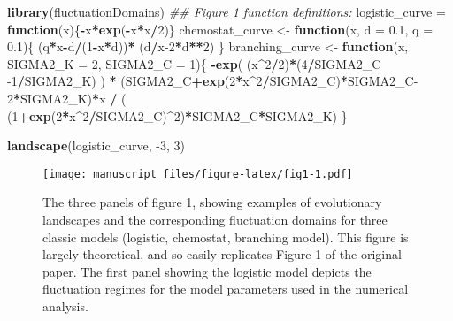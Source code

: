 \documentclass[
]{rescience}
\newenvironment{Shaded}{\begin{snugshade}}{\end{snugshade}}
\newcommand{\CommentTok}[1]{\textcolor[rgb]{0.56,0.35,0.01}{\textit{#1}}}
\newcommand{\ControlFlowTok}[1]{\textcolor[rgb]{0.13,0.29,0.53}{\textbf{#1}}}
\newcommand{\DataTypeTok}[1]{\textcolor[rgb]{0.13,0.29,0.53}{#1}}
\newcommand{\DecValTok}[1]{\textcolor[rgb]{0.00,0.00,0.81}{#1}}
\newcommand{\FloatTok}[1]{\textcolor[rgb]{0.00,0.00,0.81}{#1}}
\newcommand{\KeywordTok}[1]{\textcolor[rgb]{0.13,0.29,0.53}{\textbf{#1}}}
\newcommand{\NormalTok}[1]{#1}
\newcommand{\OperatorTok}[1]{\textcolor[rgb]{0.81,0.36,0.00}{\textbf{#1}}}
\newcommand{\StringTok}[1]{\textcolor[rgb]{0.31,0.60,0.02}{#1}}
\begin{document}
\begin{Shaded}
\begin{Highlighting}[]
\KeywordTok{library}\NormalTok{(fluctuationDomains)}
\CommentTok{## Figure 1 function definitions:}
\NormalTok{logistic_curve =}\StringTok{ }\ControlFlowTok{function}\NormalTok{(x)\{}\OperatorTok{-}\NormalTok{x}\OperatorTok{*}\KeywordTok{exp}\NormalTok{(}\OperatorTok{-}\NormalTok{x}\OperatorTok{*}\NormalTok{x}\OperatorTok{/}\DecValTok{2}\NormalTok{)\}}
\NormalTok{chemostat_curve <-}\StringTok{ }\ControlFlowTok{function}\NormalTok{(x, }\DataTypeTok{d =} \FloatTok{0.1}\NormalTok{, }\DataTypeTok{q =} \FloatTok{0.1}\NormalTok{)\{}
\NormalTok{  (q}\OperatorTok{*}\NormalTok{x}\OperatorTok{-}\NormalTok{d}\OperatorTok{/}\NormalTok{(}\DecValTok{1}\OperatorTok{-}\NormalTok{x}\OperatorTok{*}\NormalTok{d))}\OperatorTok{*}\StringTok{ }\NormalTok{(d}\OperatorTok{/}\NormalTok{x}\DecValTok{-2}\OperatorTok{*}\NormalTok{d}\OperatorTok{**}\DecValTok{2}\NormalTok{)}
\NormalTok{\}}
\NormalTok{branching_curve <-}\StringTok{ }\ControlFlowTok{function}\NormalTok{(x, }\DataTypeTok{SIGMA2_K =} \DecValTok{2}\NormalTok{, }\DataTypeTok{SIGMA2_C =} \DecValTok{1}\NormalTok{)\{}
  \OperatorTok{-}\KeywordTok{exp}\NormalTok{( (x}\OperatorTok{^}\DecValTok{2}\OperatorTok{/}\DecValTok{2}\NormalTok{)}\OperatorTok{*}\NormalTok{(}\DecValTok{4}\OperatorTok{/}\NormalTok{SIGMA2_C }\DecValTok{-1}\OperatorTok{/}\NormalTok{SIGMA2_K) ) }\OperatorTok{*}
\StringTok{    }\NormalTok{(SIGMA2_C}\OperatorTok{+}\KeywordTok{exp}\NormalTok{(}\DecValTok{2}\OperatorTok{*}\NormalTok{x}\OperatorTok{^}\DecValTok{2}\OperatorTok{/}\NormalTok{SIGMA2_C)}\OperatorTok{*}\NormalTok{SIGMA2_C}\DecValTok{-2}\OperatorTok{*}\NormalTok{SIGMA2_K)}\OperatorTok{*}\NormalTok{x }\OperatorTok{/}
\StringTok{    }\NormalTok{( (}\DecValTok{1}\OperatorTok{+}\KeywordTok{exp}\NormalTok{(}\DecValTok{2}\OperatorTok{*}\NormalTok{x}\OperatorTok{^}\DecValTok{2}\OperatorTok{/}\NormalTok{SIGMA2_C)}\OperatorTok{^}\DecValTok{2}\NormalTok{)}\OperatorTok{*}\NormalTok{SIGMA2_C}\OperatorTok{*}\NormalTok{SIGMA2_K)}
\NormalTok{\}}

\KeywordTok{landscape}\NormalTok{(logistic_curve, }\DecValTok{-3}\NormalTok{, }\DecValTok{3}\NormalTok{)}
\end{Highlighting}
\end{Shaded}

\begin{figure}
\centering
\texttt{[image: manuscript\_files/figure-latex/fig1-1.pdf]}
\caption{The three panels of figure 1, showing examples of evolutionary
landscapes and the corresponding fluctuation domains for three classic
models (logistic, chemostat, branching model). This figure is largely
theoretical, and so easily replicates Figure 1 of the original paper.
The first panel showing the logistic model depicts the fluctuation
regimes for the model parameters used in the numerical analysis.}
\end{figure}
\end{document}
